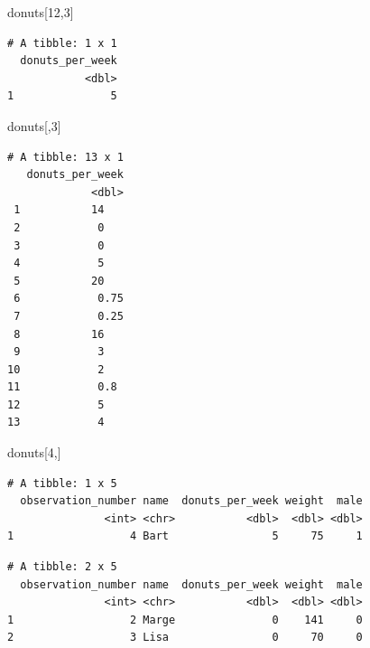 \documentclass[]{book}
\newenvironment{Shaded}{\begin{snugshade}}{\end{snugshade}}
\newcommand{\DecValTok}[1]{\textcolor[rgb]{0.00,0.00,0.81}{#1}}
\newcommand{\NormalTok}[1]{#1}
\newcommand{\OperatorTok}[1]{\textcolor[rgb]{0.81,0.36,0.00}{\textbf{#1}}}
\newcommand{\StringTok}[1]{\textcolor[rgb]{0.31,0.60,0.02}{#1}}
\begin{document}
\begin{Shaded}
\begin{Highlighting}[]
\NormalTok{donuts[}\DecValTok{12}\NormalTok{,}\DecValTok{3}\NormalTok{]}
\end{Highlighting}
\end{Shaded}

\begin{verbatim}
# A tibble: 1 x 1
  donuts_per_week
            <dbl>
1               5
\end{verbatim}

\begin{Shaded}
\begin{Highlighting}[]
\NormalTok{donuts[,}\DecValTok{3}\NormalTok{]}
\end{Highlighting}
\end{Shaded}

\begin{verbatim}
# A tibble: 13 x 1
   donuts_per_week
             <dbl>
 1           14   
 2            0   
 3            0   
 4            5   
 5           20   
 6            0.75
 7            0.25
 8           16   
 9            3   
10            2   
11            0.8 
12            5   
13            4   
\end{verbatim}

\begin{Shaded}
\begin{Highlighting}[]
\NormalTok{donuts[}\DecValTok{4}\NormalTok{,]}
\end{Highlighting}
\end{Shaded}

\begin{verbatim}
# A tibble: 1 x 5
  observation_number name  donuts_per_week weight  male
               <int> <chr>           <dbl>  <dbl> <dbl>
1                  4 Bart                5     75     1
\end{verbatim}

\begin{Shaded}
\end{Shaded}

\begin{verbatim}
# A tibble: 2 x 5
  observation_number name  donuts_per_week weight  male
               <int> <chr>           <dbl>  <dbl> <dbl>
1                  2 Marge               0    141     0
2                  3 Lisa                0     70     0
\end{verbatim}
\end{document}
